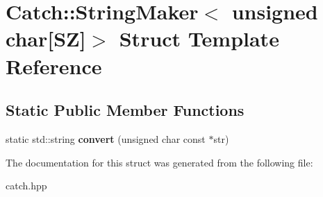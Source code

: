 \hypertarget{structCatch_1_1StringMaker_3_01unsigned_01char[SZ]_4}{}\section{Catch\+:\+:String\+Maker$<$ unsigned char\mbox{[}SZ\mbox{]}$>$ Struct Template Reference}
\label{structCatch_1_1StringMaker_3_01unsigned_01char[SZ]_4}
\subsection*{Static Public Member Functions}
\begin{DoxyCompactItemize}
\item 
static std\+::string {\bfseries convert} (unsigned char const $\ast$str)\hypertarget{structCatch_1_1StringMaker_3_01unsigned_01char[SZ]_4_a590d64c72b0cc75c113f1eea95d52b66}{}\label{structCatch_1_1StringMaker_3_01unsigned_01char[SZ]_4_a590d64c72b0cc75c113f1eea95d52b66}

\end{DoxyCompactItemize}


The documentation for this struct was generated from the following file\+:\begin{DoxyCompactItemize}
\item 
catch.\+hpp\end{DoxyCompactItemize}
